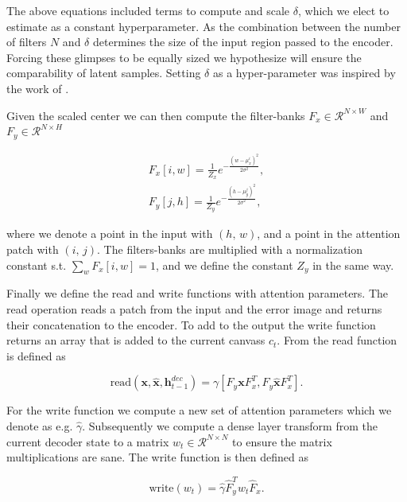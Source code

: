 \noindent The above equations included terms to compute and scale $\delta$, which we elect to estimate as a constant hyperparameter. As the combination between the number of filters $N$ and $\delta$ determines the size of the input region passed to the encoder. Forcing these glimpses to be equally sized we hypothesize will ensure the comparability of latent samples. Setting $\delta$ as a hyper-parameter was inspired by the work of \citet{Harris2019}.

Given the scaled center we can then compute the filter-banks $F_x \in \mathcal{R}^{N \times W}$ and $F_y \in \mathcal{R}^{N \times H}$

\begin{align}
F_x [i, w] = \frac{1}{Z_x}e^{-\frac{(w - \mu_x^i)^2}{2\sigma^2}},\label{eq:Fx} \\
F_y [j, h] = \frac{1}{Z_y}e^{-\frac{(h - \mu_y^j)^2}{2\sigma^2}},\label{eq:Fy}
\end{align}

\noindent where we denote a point in the input with $(h,\, w)$, and a point in the attention patch with $(i,\, j)$. The filters-banks are multiplied with a normalization constant s.t. $\sum_w F_x[i, w] = 1$, and we define the constant $Z_y$ in the same way. 

Finally we define the read and write functions with attention parameters. The read operation reads a patch from the input and the error image and returns their concatenation to the encoder. To add to the output the write function returns an array that is added to the current canvass $c_t$. From \citet{Gregor2015} the read function is defined as

\begin{equation}\label{eq:read}
\text{read}(\mathbf{x}, \mathbf{\hat{x}}, \mathbf{h}_{t-1}^{dec}) = \gamma[F_y \mathbf{x} F_x^T, F_y \mathbf{\hat{x}} F_x^T].
\end{equation} 

\noindent For the write function we compute a new set of attention parameters which we denote as e.g. $\hat{\gamma}$. Subsequently we compute a dense layer transform from the current decoder state to a matrix $w_t \in \mathcal{R}^{N \times N}$ to ensure the matrix multiplications are sane. The write function is then defined as

\begin{equation}\label{eq:write}
\text{write}(w_t)  = \hat{\gamma} \hat{F}^T_y w_t \hat{F}_x.
\end{equation}

